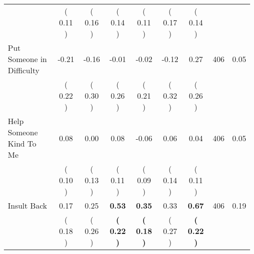 \begin{tabular}{lcccccccc}
 & (     0.11 ) & (     0.16 ) & (     0.14 ) & (     0.11 ) & (     0.17 ) & (     0.14 ) & \\
Put Someone in Difficulty &     -0.21 &     -0.16 &     -0.01 &     -0.02 &     -0.12 &      0.27 & 406 &       0.05 \\ 
 & (     0.22 ) & (     0.30 ) & (     0.26 ) & (     0.21 ) & (     0.32 ) & (     0.26 ) & \\
Help Someone Kind To Me &      0.08 &      0.00 &      0.08 &     -0.06 &      0.06 &      0.04 & 406 &       0.05 \\ 
 & (     0.10 ) & (     0.13 ) & (     0.11 ) & (     0.09 ) & (     0.14 ) & (     0.11 ) & \\
Insult Back &      0.17 &      0.25 & \textbf{     0.53} & \textbf{     0.35} &      0.33 & \textbf{     0.67} & 406 &       0.19 \\ 
 & (     0.18 ) & (     0.26 ) & \textbf{(     0.22 )} & \textbf{(     0.18 )} & (     0.27 ) & \textbf{(     0.22 )} & \\
\bottomrule
\end{tabular}
